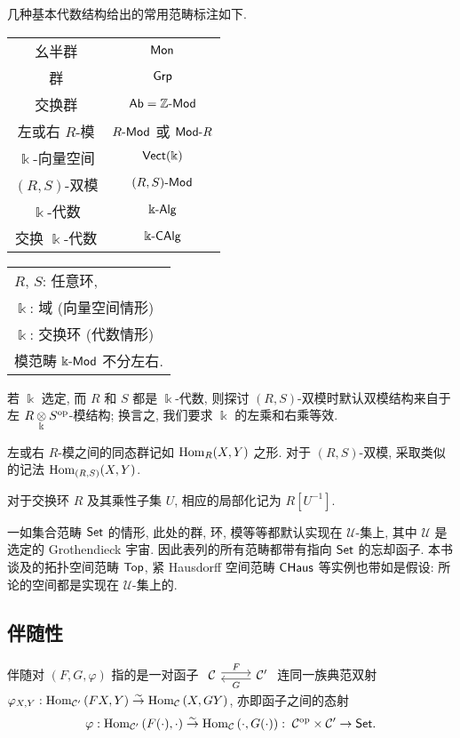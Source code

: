 几种基本代数结构给出的常用范畴标注如下.
\begin{center}\small \begin{tabular}{|c|c|}\hline
	幺半群 & $\mathsf{Mon}$ \\
	群 &  $\mathsf{Grp}$ \\
	交换群 & $\mathsf{Ab} = \mathbb{Z}\text{-}\mathsf{Mod}$ \\
	左或右 $R$-模 & $R\text{-}\mathsf{Mod}$ 或 $\mathsf{Mod}\text{-}R$ \\
	$\Bbbk$-向量空间 & $\mathsf{Vect}(\Bbbk)$ \\
	$(R,S)$-双模 & $(R,S)\text{-}\mathsf{Mod}$ \\
	$\Bbbk$-代数 & $\Bbbk\text{-}\mathsf{Alg}$ \\
	交换 $\Bbbk$-代数 & $\Bbbk\text{-}\mathsf{CAlg}$
	\\ \hline
\end{tabular} \quad \begin{tabular}{l}
	$R$, $S$: 任意环, \\
	$\Bbbk$: 域 (向量空间情形) \\
	$\Bbbk$: 交换环 (代数情形) \\
	模范畴 $\Bbbk\text{-}\mathsf{Mod}$ 不分左右.
\end{tabular}\end{center}

若 $\Bbbk$ 选定, 而 $R$ 和 $S$ 都是 $\Bbbk$-代数, 则探讨 $(R, S)$-双模时默认双模结构来自于左 $R \underset{\Bbbk}{\otimes} S^{\operatorname{op}}$-模结构; 换言之, 我们要求 $\Bbbk$ 的左乘和右乘等效.

左或右 $R$-模之间的同态群记如 $\operatorname{Hom}_R(X, Y)$ 之形. 对于 $(R,S)$-双模, 采取类似的记法 $\operatorname{Hom}_{(R, S)}(X, Y)$.

对于交换环 $R$ 及其乘性子集 $U$, 相应的局部化记为 $R[U^{-1}]$.

一如集合范畴 $\mathsf{Set}$ 的情形, 此处的群, 环, 模等等都默认实现在 $\mathcal{U}$-集上, 其中 $\mathcal{U}$ 是选定的 Grothendieck 宇宙. 因此表列的所有范畴都带有指向 $\mathsf{Set}$ 的忘却函子. 本书谈及的拓扑空间范畴 $\mathsf{Top}$, 紧 Hausdorff 空间范畴 $\mathsf{CHaus}$ 等实例也带如是假设: 所论的空间都是实现在 $\mathcal{U}$-集上的.

\subsection*{伴随性}
伴随对 $(F, G, \varphi)$ 指的是一对函子
$\begin{tikzcd}
	\mathcal{C} \arrow[shift left, r, "F"] & \mathcal{C}' \arrow[shift left, l, "G"]
\end{tikzcd}$
连同一族典范双射 $\varphi_{X, Y}: \operatorname{Hom}_{\mathcal{C}'}\left(FX, Y \right) \stackrel{\sim}{\rightarrow} \operatorname{Hom}_{\mathcal{C}}\left(X, GY \right)$, 亦即函子之间的态射
\[ \varphi: \operatorname{Hom}_{\mathcal{C}'}\left(F(\cdot), \cdot \right) \stackrel{\sim}{\rightarrow} \operatorname{Hom}_{\mathcal{C}}\left(\cdot, G(\cdot) \right): \; \mathcal{C}^{\operatorname{op}} \times \mathcal{C}' \to \mathsf{Set}. \]

